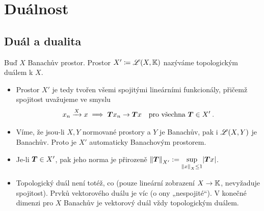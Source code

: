 %





\section{Duálnost}

\subsection{Duál a dualita}

\begin{definition}[Duál]
Buď $X$ Banachův prostor. Prostor $X' \coloneqq \mathscr{L}(X,\mathbb{K})$ %
nazýváme topologickým duálem k $X$.

\end{definition}

\begin{remark} 
\begin{itemize}
    \item Prostor $X'$ je tedy tvořen všemi spojitými lineárními funkcionály, přičemž spojitost uvažujeme ve smyslu \begin{align*}
        x_n \xrightarrow{X} x \implies \boldsymbol{T} x_n \to \boldsymbol{T} x \quad \text{pro všechna } \boldsymbol{T} \in X' \:.
    \end{align*}
    \item Víme, že jsou-li $X,Y$ normované prostory a $Y$ je Banachův, pak i $\mathscr{L} (X,Y)$ je Banachův. Proto je $X'$ automaticky Banachovým prostorem.
    \item Je-li $\boldsymbol{T} \in X'$, pak jeho norma je přirozeně $\left\lVert\boldsymbol{T}\right\rVert_{X'} := \underset{\left\lVert x\right\rVert_X \leq 1}{\sup} |\boldsymbol{T}x|$.
    \item Topologický duál není totéž, co  (pouze lineární zobrazení $X \to \mathbb{K}$, nevyžaduje spojitost). Prvků vektorového duálu je víc (o ony „nespojité“). V konečné dimenzi pro $X$ Banachův je vektorový duál vždy topologickým duálem.
\end{itemize}
\end{remark}


